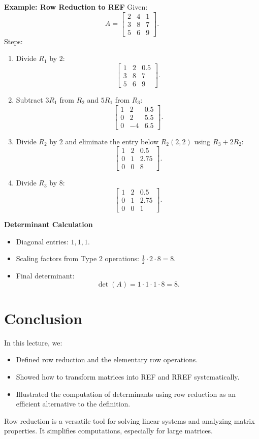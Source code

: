 \documentclass{article}
\begin{document}
\textbf{Example: Row Reduction to REF}
Given:
\[
  A =
  \begin{bmatrix}
    2 & 4 & 1 \\
    3 & 8 & 7 \\
    5 & 6 & 9
  \end{bmatrix}.
\]
Steps:
\begin{enumerate}
  \item Divide $R_1$ by $2$:
    \[
      \begin{bmatrix}
        1 & 2 & 0.5 \\
        3 & 8 & 7 \\
        5 & 6 & 9
      \end{bmatrix}.
    \]
  \item Subtract $3R_1$ from $R_2$ and $5R_1$ from $R_3$:
    \[
      \begin{bmatrix}
        1 & 2 & 0.5 \\
        0 & 2 & 5.5 \\
        0 & -4 & 6.5
      \end{bmatrix}.
    \]
  \item Divide $R_2$ by $2$ and eliminate the entry below $R_2(2,2)$ using $R_3 + 2R_2$:
    \[
      \begin{bmatrix}
        1 & 2 & 0.5 \\
        0 & 1 & 2.75 \\
        0 & 0 & 8
      \end{bmatrix}.
    \]
  \item Divide $R_3$ by $8$:
    \[
      \begin{bmatrix}
        1 & 2 & 0.5 \\
        0 & 1 & 2.75 \\
        0 & 0 & 1
      \end{bmatrix}.
    \]
\end{enumerate}

\textbf{Determinant Calculation}
\begin{itemize}
  \item Diagonal entries: $1, 1, 1$.
  \item Scaling factors from Type 2 operations: $\frac{1}{2} \cdot 2 \cdot 8 = 8$.
  \item Final determinant:
    \[
      \det(A) = 1 \cdot 1 \cdot 1 \cdot 8 = 8.
    \]
\end{itemize}

\section*{Conclusion}

In this lecture, we:
\begin{itemize}
  \item Defined row reduction and the elementary row operations.
  \item Showed how to transform matrices into REF and RREF systematically.
  \item Illustrated the computation of determinants using row reduction as an efficient alternative to the definition.
\end{itemize}

Row reduction is a versatile tool for solving linear systems and analyzing matrix properties. It simplifies computations, especially for large matrices.
\end{document}
